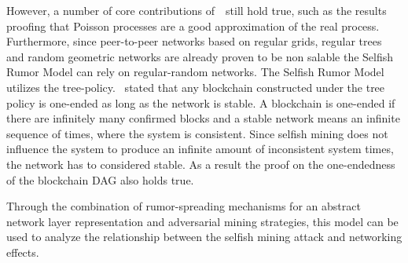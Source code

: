 However, a number of core contributions of~~still hold true, such as the results proofing that Poisson processes are a good approximation of the real process. Furthermore, since peer-to-peer networks based on regular grids, regular trees and random geometric networks are already proven to be non salable the Selfish Rumor Model can rely on regular-random networks. The Selfish Rumor Model utilizes the tree-policy. ~stated that any blockchain constructed under the tree policy is one-ended as long as the network is stable. A blockchain is one-ended if there are infinitely many confirmed blocks and a stable network means an infinite sequence of times, where the system is consistent. Since selfish mining does not influence the system to produce an infinite amount of inconsistent system times, the network has to considered stable. As a result the proof on the one-endedness of the blockchain DAG also holds true.

Through the combination of rumor-spreading mechanisms for an abstract network layer representation and adversarial mining strategies, this model can be used to analyze the relationship between the selfish mining attack and networking effects.




